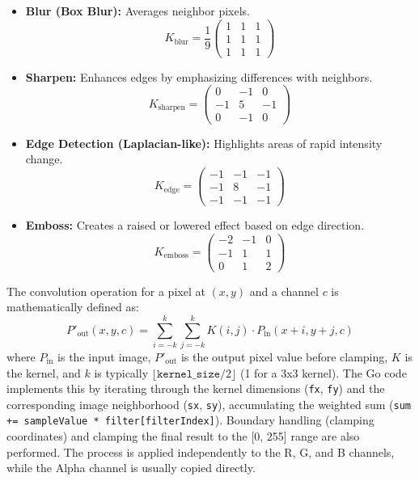 \documentclass{article}
\begin{document}
\begin{itemize}
    \item \textbf{Blur (Box Blur):} Averages neighbor pixels.
    \[ K_{\text{blur}} = \frac{1}{9} \begin{pmatrix} 1 & 1 & 1 \\ 1 & 1 & 1 \\ 1 & 1 & 1 \end{pmatrix} \]
    \item \textbf{Sharpen:} Enhances edges by emphasizing differences with neighbors.
    \[ K_{\text{sharpen}} = \begin{pmatrix} 0 & -1 & 0 \\ -1 & 5 & -1 \\ 0 & -1 & 0 \end{pmatrix} \]
    \item \textbf{Edge Detection (Laplacian-like):} Highlights areas of rapid intensity change.
    \[ K_{\text{edge}} = \begin{pmatrix} -1 & -1 & -1 \\ -1 & 8 & -1 \\ -1 & -1 & -1 \end{pmatrix} \]
    \item \textbf{Emboss:} Creates a raised or lowered effect based on edge direction.
    \[ K_{\text{emboss}} = \begin{pmatrix} -2 & -1 & 0 \\ -1 & 1 & 1 \\ 0 & 1 & 2 \end{pmatrix} \]
\end{itemize}

The convolution operation for a pixel at $(x, y)$ and a channel $c$ is mathematically defined as:
\[
P'_{\text{out}}(x, y, c) = \sum_{i=-k}^{k} \sum_{j=-k}^{k} K(i, j) \cdot P_{\text{in}}(x+i, y+j, c)
\]
where $P_{\text{in}}$ is the input image, $P'_{\text{out}}$ is the output pixel value before clamping, $K$ is the kernel, and $k$ is typically $\lfloor \texttt{kernel\_size} / 2 \rfloor$ (1 for a 3x3 kernel). The Go code implements this by iterating through the kernel dimensions (\texttt{fx}, \texttt{fy}) and the corresponding image neighborhood (\texttt{sx}, \texttt{sy}), accumulating the weighted sum (\texttt{sum += sampleValue * filter[filterIndex]}). Boundary handling (clamping coordinates) and clamping the final result to the [0, 255] range are also performed. The process is applied independently to the R, G, and B channels, while the Alpha channel is usually copied directly.
\end{document}
